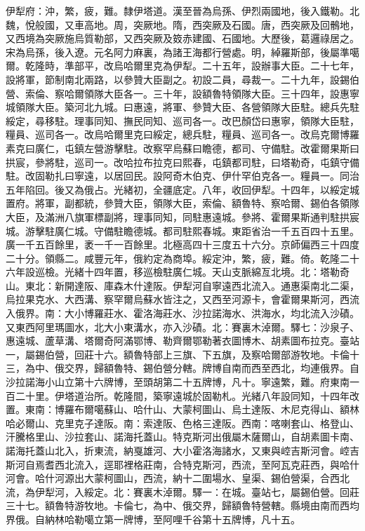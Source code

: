 \begin{pinyinscope}
伊犁府：沖，繁，疲，難。隸伊塔道。漢至晉為烏孫、伊烈兩國地，後入鐵勒。北魏，悅般國，又車高地。周，突厥地。隋，西突厥及石國。唐，西突厥及回鶻地，又西境為突厥施烏質勒部，又西突厥及笯赤建國、石國地。大歷後，葛邏祿居之。宋為烏孫，後入遼。元名阿力麻裏，為諸王海都行營處。明，綽羅斯部，後屬準噶爾。乾隆時，準部平，改烏哈爾里克為伊犁。二十五年，設辦事大臣。二十七年，設將軍，節制南北兩路，以參贊大臣副之。初設二員，尋裁一。二十九年，設錫伯營、索倫、察哈爾領隊大臣各一。三十年，設額魯特領隊大臣。三十四年，設惠寧城領隊大臣。築河北九城。曰惠遠，將軍、參贊大臣、各營領隊大臣駐。總兵先駐綏定，尋移駐。理事同知、撫民同知、巡司各一。改巴顏岱曰惠寧，領隊大臣駐，糧員、巡司各一。改烏哈爾里克曰綏定，總兵駐，糧員、巡司各一。改烏克爾博羅素克曰廣仁，屯鎮左營游擊駐。改察罕烏蘇曰瞻德，都司、守備駐。改霍爾果斯曰拱宸，參將駐，巡司一。改哈拉布拉克曰熙春，屯鎮都司駐，曰塔勒奇，屯鎮守備駐。改固勒扎曰寧遠，以居回民。設阿奇木伯克、伊什罕伯克各一。糧員一。同治五年陷回。後又為俄占。光緒初，全疆底定。八年，收回伊犁。十四年，以綏定城置府。將軍，副都統，參贊大臣，領隊大臣，索倫、額魯特、察哈爾、錫伯各領隊大臣，及滿洲八旗軍標副將，理事同知，同駐惠遠城。參將、霍爾果斯通判駐拱宸城。游擊駐廣仁城。守備駐瞻德城。都司駐熙春城。東距省治一千五百四十五里。廣一千五百餘里，袤一千一百餘里。北極高四十三度五十六分。京師偏西三十四度二十分。領縣二。咸豐元年，俄約定為商埠。綏定沖，繁，疲，難。倚。乾隆二十六年設巡檢。光緒十四年置，移巡檢駐廣仁城。天山支脈綿亙北境。北：塔勒奇山。東北：新開達阪、庫森木什達阪。伊犁河自寧遠西北流入。通惠渠南北二渠，烏拉果克水、大西溝、察罕爾烏蘇水皆注之，又西至河源卡，會霍爾果斯河，西流入俄界。南：大小博羅莊水、霍洛海莊水、沙拉諾海水、洪海水，均北流入沙磧。又東西阿里瑪圖水，北大小東溝水，亦入沙磧。北：賽裏木淖爾。驛七：沙泉子、惠遠城、蘆草溝、塔爾奇阿滿鄂博、勒齊爾鄂勒著衣圖博木、胡素圖布拉克。臺站一，屬錫伯營，回莊十六。額魯特部上三旗、下五旗，及察哈爾部游牧地。卡倫十三，為中、俄交界，歸額魯特、錫伯營分轄。牌博自南而西至西北，均連俄界。自沙拉諾海小山立第十六牌博，至頭胡第二十五牌博，凡十。寧遠繁，難。府東南一百二十里。伊塔道治所。乾隆間，築寧遠城於固勒札。光緒八年設同知，十四年改置。東南：博羅布爾噶蘇山、哈什山、大蒙柯圖山、烏土達阪、木尼克得山、額林哈必爾山、克里克子達阪。南：索達阪、色格三達阪。西南：喀喇套山、格登山、汗騰格里山、沙拉套山、諾海托蓋山。特克斯河出俄屬木薩爾山，自胡素圖卡南、諾海托蓋山北入，折東流，納戛雄河、大小霍洛海諸水，又東與崆吉斯河會。崆吉斯河自焉耆西北流入，逕耶裡格莊南，合特克斯河，西流，至阿瓦克莊西，與哈什河會。哈什河源出大蒙柯圖山，西流，納十二圍場水、皇渠、錫伯營渠，合西北流，為伊犁河，入綏定。北：賽裏木淖爾。驛一：在城。臺站七，屬錫伯營。回莊三十七。額魯特游牧地。卡倫七，為中、俄交界，歸額魯特營轄。縣境由南而西均界俄。自納林哈勒噶立第一牌博，至阿哩千谷第十五牌博，凡十五。


\end{pinyinscope}
